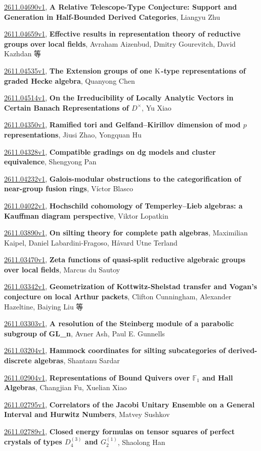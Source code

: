 \documentclass[9pt, a4paper]{article}
\theoremstyle{plain}
\theoremstyle{definition}
\theoremstyle{remark}
\newcommand{\arxiv}[3]{\href{https://arxiv.org/abs/#1}{#1}, \textbf{\textcolor{arxivblue}{#2}}, #3}
\begin{document}
\arxiv{2611.04690v1}{A Relative Telescope-Type Conjecture: Support and Generation in Half-Bounded Derived Categories}{Liangyu Zhu}

\arxiv{2611.04659v1}{Effective results in representation theory of reductive groups over local fields}{Avraham Aizenbud, Dmitry Gourevitch, David Kazhdan 等}

\arxiv{2611.04535v1}{The Extension groups of one $\rm K$-type representations of graded Hecke algebra}{Quanyong Chen}

\arxiv{2611.04514v1}{On the Irreducibility of Locally Analytic Vectors in Certain Banach Representations of $D^\times$}{Yu Xiao}

\arxiv{2611.04350v1}{Ramified tori and Gelfand--Kirillov dimension of mod $p$ representations}{Jiusi Zhao, Yongquan Hu}

\arxiv{2611.04328v1}{Compatible gradings on dg models and cluster equivalence}{Shengyong Pan}

\arxiv{2611.04232v1}{Galois-modular obstructions to the categorification of near-group fusion rings}{Víctor Blasco}

\arxiv{2611.04022v1}{Hochschild cohomology of Temperley--Lieb algebras: a Kauffman diagram perspective}{Viktor Lopatkin}

\arxiv{2611.03890v1}{On silting theory for complete path algebras}{Maximilian Kaipel, Daniel Labardini-Fragoso, Håvard Utne Terland}

\arxiv{2611.03470v1}{Zeta functions of quasi-split reductive algebraic groups over local fields}{Marcus du Sautoy}

\arxiv{2611.03342v1}{Geometrization of Kottwitz-Shelstad transfer and Vogan's conjecture on local Arthur packets}{Clifton Cunningham, Alexander Hazeltine, Baiying Liu 等}

\arxiv{2611.03303v1}{A resolution of the Steinberg module of a parabolic subgroup of GL_n}{Avner Ash, Paul E. Gunnells}

\arxiv{2611.03204v1}{Hammock coordinates for silting subcategories of derived-discrete algebras}{Shantanu Sardar}

\arxiv{2611.02904v1}{Representations of Bound Quivers over $\mathbb{F}_1$ and Hall Algebras}{Changjian Fu, Xuelian Xiao}

\arxiv{2611.02795v1}{Correlators of the Jacobi Unitary Ensemble on a General Interval and Hurwitz Numbers}{Matvey Sushkov}

\arxiv{2611.02789v1}{Closed energy formulas on tensor squares of perfect crystals of types $D_4^{(3)}$ and $G_2^{(1)}$}{Shaolong Han}
\end{document}
